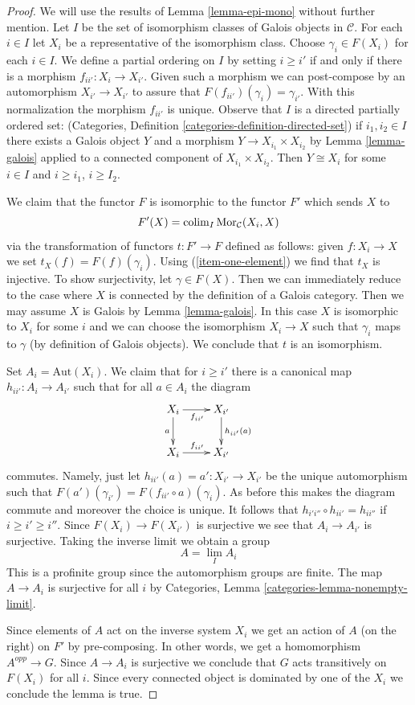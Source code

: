 \begin{proof}
We will use the results of Lemma \ref{lemma-epi-mono} without further mention.
Let $I$ be the set of isomorphism classes of Galois objects in $\mathcal{C}$.
For each $i \in I$ let $X_i$ be a representative of the isomorphism class.
Choose $\gamma_i \in F(X_i)$ for each $i \in I$.
We define a partial ordering on $I$ by setting $i \geq i'$ if
and only if there is a morphism $f_{ii'} : X_i \to X_{i'}$.
Given such a morphism we can post-compose by an automorphism
$X_{i'} \to X_{i'}$ to assure that $F(f_{ii'})(\gamma_i) = \gamma_{i'}$.
With this normalization the morphism $f_{ii'}$ is unique.
Observe that $I$ is a directed partially ordered set:
(Categories, Definition \ref{categories-definition-directed-set})
if $i_1, i_2 \in I$ there exists a Galois object $Y$ and a morphism
$Y \to X_{i_1} \times X_{i_2}$ by Lemma \ref{lemma-galois} applied
to a connected component of $X_{i_1} \times X_{i_2}$.
Then $Y \cong X_i$ for some $i \in I$ and $i \geq i_1$, $i \geq I_2$.

\medskip\noindent
We claim that the functor $F$ is isomorphic to the functor $F'$
which sends $X$ to
$$
F'(X) = \mathop{\mathrm{colim}}\nolimits_I \mathop{\mathrm{Mor}}\nolimits_\mathcal{C}(X_i, X)
$$
via the transformation of functors $t : F' \to F$ defined as follows:
given $f : X_i \to X$ we set $t_X(f) = F(f)(\gamma_i)$.
Using (\ref{item-one-element}) we find that $t_X$ is injective.
To show surjectivity, let $\gamma \in F(X)$. Then we can immediately
reduce to the case where $X$ is connected by the definition of
a Galois category. Then we may assume $X$ is Galois by
Lemma \ref{lemma-galois}. In this case $X$ is isomorphic to $X_i$
for some $i$ and we can choose the isomorphism $X_i \to X$ such
that $\gamma_i$ maps to $\gamma$ (by definition of Galois objects).
We conclude that $t$ is an isomorphism.

\medskip\noindent
Set $A_i = \text{Aut}(X_i)$.
We claim that for $i \geq i'$ there is a canonical map
$h_{ii'} : A_i \to A_{i'}$ such that for all $a \in A_i$
the diagram
$$
\xymatrix{
X_i \ar[d]_a \ar[r]_{f_{ii'}} & X_{i'} \ar[d]^{h_{ii'}(a)} \\
X_i \ar[r]^{f_{ii'}} & X_{i'}
}
$$
commutes. Namely, just let $h_{ii'}(a) = a' : X_{i'} \to X_{i'}$
be the unique automorphism such that
$F(a')(\gamma_{i'}) = F(f_{ii'} \circ a)(\gamma_i)$.
As before this makes the diagram commute and moreover the choice
is unique.
It follows that
$h_{i'i''} \circ h_{ii'} = h_{ii''}$
if $i \geq i' \geq i''$.
Since $F(X_i) \to F(X_{i'})$ is surjective we see that
$A_i \to A_{i'}$ is surjective.
Taking the inverse limit we obtain a group
$$
A = \lim_I A_i
$$
This is a profinite group since the automorphism groups are finite.
The map $A \to A_i$ is surjective for all $i$ by
Categories, Lemma \ref{categories-lemma-nonempty-limit}.

\medskip\noindent
Since elements of $A$ act on the inverse system $X_i$ we get an action of
$A$ (on the right) on $F'$ by pre-composing. In other words, we get
a homomorphism $A^{opp} \to G$. Since $A \to A_i$ is surjective we conclude
that $G$ acts transitively on $F(X_i)$ for all $i$. Since every connected
object is dominated by one of the $X_i$ we conclude the lemma is true.
\end{proof}


